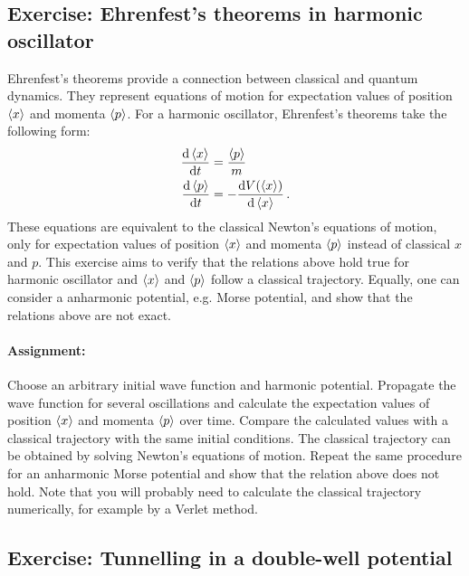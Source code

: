 \subsection*{Exercise: Ehrenfest's theorems in harmonic oscillator}

Ehrenfest's theorems provide a connection between classical and quantum dynamics. They represent equations of motion for expectation values of position $\braket{x}$ and momenta $\braket{p}$. For a harmonic oscillator, Ehrenfest's theorems take the following form:
\begin{align*}
    \frac{\mathop{}\!\mathrm{d} \braket{x}}{\mathop{}\!\mathrm{d} t} &= \frac{\braket{p}}{m} \\
    \frac{\mathop{}\!\mathrm{d} \braket{p}}{\mathop{}\!\mathrm{d} t} &= -\frac{\mathop{}\!\mathrm{d} V(\braket{x})}{\mathop{}\!\mathrm{d} \braket{x}} \, .
\end{align*}
These equations are equivalent to the classical Newton's equations of motion, only for expectation values of position $\braket{x}$ and momenta $\braket{p}$ instead of classical $x$ and $p$. This exercise aims to verify that the relations above hold true for harmonic oscillator and $\braket{x}$ and $\braket{p}$ follow a classical trajectory. Equally, one can consider a anharmonic potential, e.g. Morse potential, and show that the relations above are not exact.

\paragraph{Assignment:} Choose an arbitrary initial wave function and harmonic potential. Propagate the wave function for several oscillations and calculate the expectation values of position $\braket{x}$ and momenta $\braket{p}$ over time. Compare the calculated values with a classical trajectory with the same initial conditions. The classical trajectory can be obtained by solving Newton's equations of motion. Repeat the same procedure for an anharmonic Morse potential and show that the relation above does not hold. Note that you will probably need to calculate the classical trajectory numerically, for example by a Verlet method.


\subsection*{Exercise: Tunnelling in a double-well potential}

